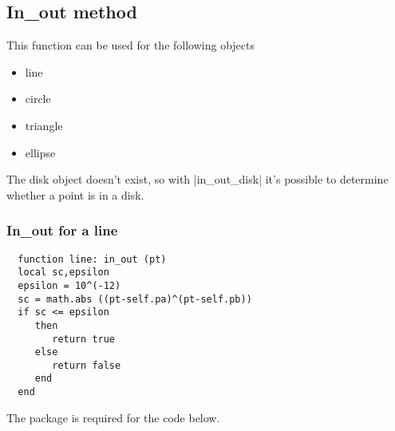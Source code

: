 
\subsection{In\_out method} %
\label{sub:in_out_method}

This function can be used for the following objects
\begin{itemize}
   \item line
   \item circle 
   \item triangle
   \item ellipse
\end{itemize}
 The disk object doesn't exist, so with |in\_out\_disk| it's possible to determine whether a point is in a disk.

\subsubsection{In\_out for a line} %
\label{ssub:in_out_for_a_line}

\begin{mybox}
\begin{Verbatim}
  function line: in_out (pt)
  local sc,epsilon
  epsilon = 10^(-12)
  sc = math.abs ((pt-self.pa)^(pt-self.pb))
  if sc <= epsilon
     then 
        return true
     else 
        return false 
     end
  end 
\end{Verbatim}
\end{mybox}

The  package is required for the code below.

